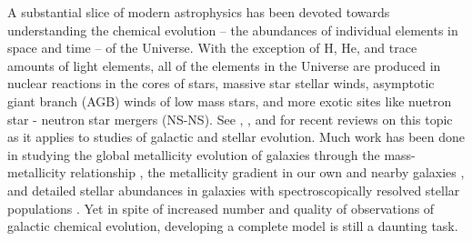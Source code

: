 A substantial slice of modern astrophysics has been devoted towards understanding the chemical evolution -- the abundances of individual elements in space and time -- of the Universe. With the exception of H, He, and trace amounts of light elements, all of the elements in the Universe are produced in nuclear reactions in the cores of stars, massive star stellar winds, asymptotic giant branch (AGB) winds of low mass stars, and more exotic sites like nuetron star - neutron star mergers (NS-NS). See \cite{Nomoto2013}, \cite{Thielmann2017}, and \cite{Frebel2018} for recent reviews on this topic as it applies to studies of galactic and stellar evolution. Much work has been done in studying the global metallicity evolution of galaxies through the mass-metallicity relationship \citep[e.g.][]{Lequeux1979,Tremonti2004,Lee2006,Zahid2012}, the metallicity gradient in our own and nearby galaxies \citep[e.g.][]{}, and detailed stellar abundances in galaxies with spectroscopically resolved stellar populations \citep[e.g.][]{}. Yet in spite of increased number and quality of observations of galactic chemical evolution, developing a complete model is still a daunting task.

